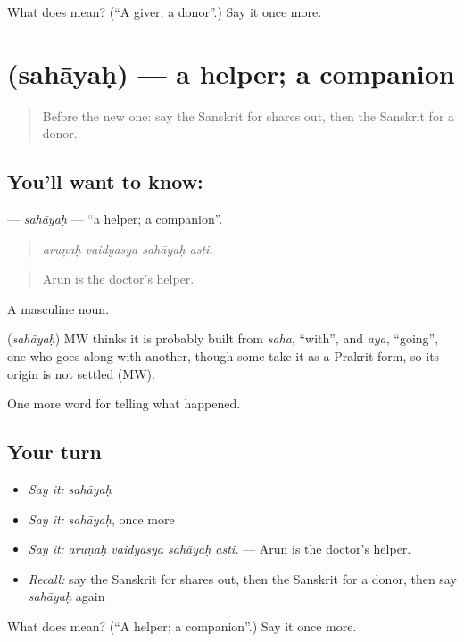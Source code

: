 \begin{tcolorbox}[breakable,colback=teal!4,colframe=teal!35!black,title={Before you move on}]
What does  mean? (\textquotedblleft{}A giver; a donor\textquotedblright{}.) Say it once more.
\end{tcolorbox}
\section[\texorpdfstring{\sk{सहायः} (sahāyaḥ)}{सहायः (sahāyaḥ)}]{ (sahāyaḥ) — a helper; a companion}

\label{lesson:SA-C308-sahayah}



\begin{quote}
Before the new one: say the Sanskrit for shares out, then the Sanskrit for a donor.
\end{quote}

\subsection*{You'll want to know: }
\textbf{} — \emph{sahāyaḥ} — \textquotedblleft{}a helper; a companion\textquotedblright{}.

\begin{quote}
   
\end{quote}

\begin{quote}
\emph{aruṇaḥ vaidyasya sahāyaḥ asti.}
\end{quote}

\begin{quote}
Arun is the doctor's helper.
\end{quote}

A masculine noun.

\begin{cousinweb}
\textbf{} (\emph{sahāyaḥ}) MW thinks it is probably built from \emph{saha}, \textquotedblleft{}with\textquotedblright{}, and \emph{aya}, \textquotedblleft{}going\textquotedblright{}, one who goes along with another, though some take it as a Prakrit form, so its origin is not settled (MW).
\end{cousinweb}

\begin{grammarlens}[title={What you've built}]
One more word for telling what happened.
\end{grammarlens}

\subsection*{Your turn}
\begin{itemize}
\raggedright
  \item \emph{Say it:} \emph{sahāyaḥ}
  \item \emph{Say it:} \emph{sahāyaḥ}, once more
  \item \emph{Say it:} \emph{aruṇaḥ vaidyasya sahāyaḥ asti.} — Arun is the doctor's helper.
  \item \emph{Recall:} say the Sanskrit for shares out, then the Sanskrit for a donor, then say \emph{sahāyaḥ} again
\end{itemize}

\begin{tcolorbox}[breakable,colback=teal!4,colframe=teal!35!black,title={Before you move on}]
What does  mean? (\textquotedblleft{}A helper; a companion\textquotedblright{}.) Say it once more.
\end{tcolorbox}
